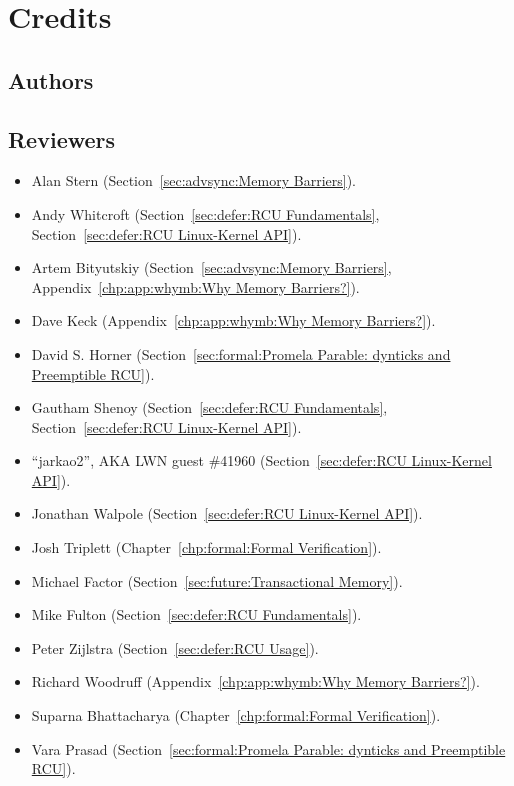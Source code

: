 
\chapter{Credits}
\label{app:ack:Credits}
%

\section{Authors}


\section{Reviewers}

\begin{itemize}
\item	Alan Stern (Section~\ref{sec:advsync:Memory Barriers}).
\item	Andy Whitcroft (Section~\ref{sec:defer:RCU Fundamentals},
	Section~\ref{sec:defer:RCU Linux-Kernel API}).
\item	Artem Bityutskiy (Section~\ref{sec:advsync:Memory Barriers},
	Appendix~\ref{chp:app:whymb:Why Memory Barriers?}).
\item	Dave Keck (Appendix~\ref{chp:app:whymb:Why Memory Barriers?}).
\item	David S. Horner
	(Section~\ref{sec:formal:Promela Parable: dynticks and Preemptible RCU}).
\item	Gautham Shenoy (Section~\ref{sec:defer:RCU Fundamentals},
	Section~\ref{sec:defer:RCU Linux-Kernel API}).
\item	``jarkao2'', AKA LWN guest \#41960 (Section~\ref{sec:defer:RCU Linux-Kernel API}).
\item	Jonathan Walpole (Section~\ref{sec:defer:RCU Linux-Kernel API}).
\item	Josh Triplett
	(Chapter~\ref{chp:formal:Formal Verification}).
\item	Michael Factor (Section~\ref{sec:future:Transactional Memory}).
\item	Mike Fulton (Section~\ref{sec:defer:RCU Fundamentals}).
\item	Peter Zijlstra
	(Section~\ref{sec:defer:RCU Usage}). %
\item	Richard Woodruff (Appendix~\ref{chp:app:whymb:Why Memory Barriers?}).
\item	Suparna Bhattacharya
	(Chapter~\ref{chp:formal:Formal Verification}).
\item	Vara Prasad
	(Section~\ref{sec:formal:Promela Parable: dynticks and Preemptible RCU}).
\end{itemize}

